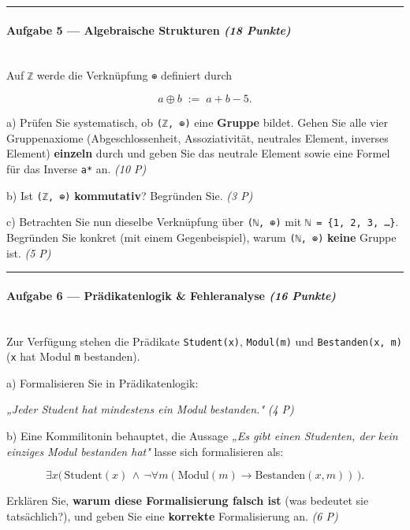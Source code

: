 \documentclass[11pt, a4paper]{article}
\begin{document}
\noindent\textcolor{rulegray}{\rule{\linewidth}{0.4pt}}


\paragraph{Aufgabe 5 — Algebraische Strukturen \textit{(18 Punkte)}}\mbox{}\\[2pt]

Auf \texttt{ℤ} werde die Verknüpfung \texttt{⊕} definiert durch

\[
a \oplus b \;:=\; a + b - 5.
\]


a) Prüfen Sie systematisch, ob \texttt{(ℤ, ⊕)} eine \textbf{Gruppe} bildet. Gehen Sie alle vier Gruppenaxiome (Abgeschlossenheit, Assoziativität, neutrales Element, inverses Element) \textbf{einzeln} durch und geben Sie das neutrale Element sowie eine Formel für das Inverse \texttt{a*} an. \textit{(10 P)}


b) Ist \texttt{(ℤ, ⊕)} \textbf{kommutativ}? Begründen Sie. \textit{(3 P)}


c) Betrachten Sie nun dieselbe Verknüpfung über \texttt{(ℕ, ⊕)} mit \texttt{ℕ = \{1, 2, 3, …\}}. Begründen Sie konkret (mit einem Gegenbeispiel), warum \texttt{(ℕ, ⊕)} \textbf{keine} Gruppe ist. \textit{(5 P)}



\noindent\textcolor{rulegray}{\rule{\linewidth}{0.4pt}}


\paragraph{Aufgabe 6 — Prädikatenlogik \& Fehleranalyse \textit{(16 Punkte)}}\mbox{}\\[2pt]

Zur Verfügung stehen die Prädikate \texttt{Student(x)}, \texttt{Modul(m)} und \texttt{Bestanden(x, m)} (\texttt{x} hat Modul \texttt{m} bestanden).


a) Formalisieren Sie in Prädikatenlogik:

\textit{„Jeder Student hat mindestens ein Modul bestanden."} \textit{(4 P)}


b) Eine Kommilitonin behauptet, die Aussage \textit{„Es gibt einen Studenten, der }\textit{kein einziges}\textit{ Modul bestanden hat"} lasse sich formalisieren als:

\[
\exists x \big(\, \text{Student}(x) \,\land\, \neg \forall m (\text{Modul}(m) \to \text{Bestanden}(x, m)) \,\big).
\]

Erklären Sie, \textbf{warum diese Formalisierung falsch ist} (was bedeutet sie tatsächlich?), und geben Sie eine \textbf{korrekte} Formalisierung an. \textit{(6 P)}
\end{document}
